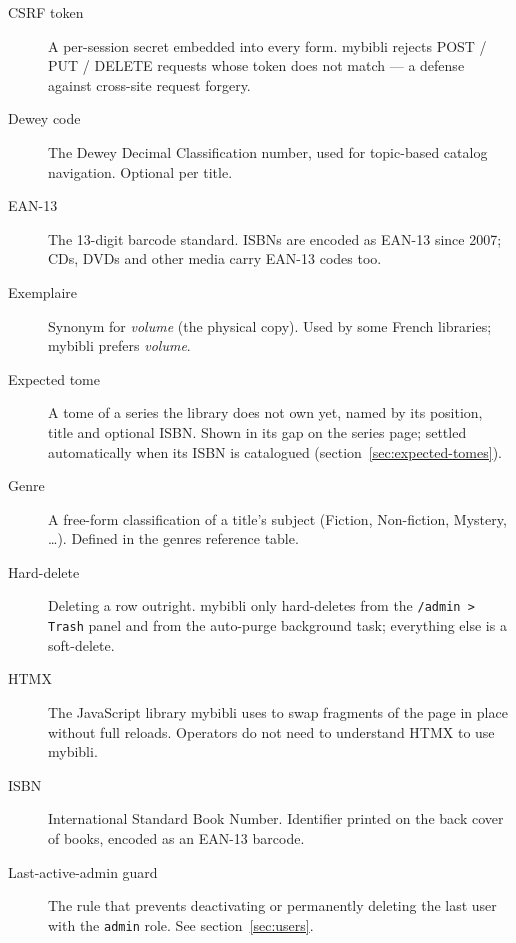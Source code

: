 \begin{description}
  \item[CSRF token] A per-session secret embedded into
        every form. mybibli rejects POST / PUT / DELETE requests
        whose token does not match — a defense against cross-site
        request forgery.

  \item[Dewey code] The Dewey Decimal Classification
        number, used for topic-based catalog navigation. Optional
        per title.

  \item[EAN-13] The 13-digit barcode standard. ISBNs are encoded
        as EAN-13 since 2007; CDs, DVDs and other media carry
        EAN-13 codes too.

  \item[Exemplaire] Synonym for \emph{volume} (the physical copy).
        Used by some French libraries; mybibli prefers
        \emph{volume}.

  \item[Expected tome] A tome of a series the
        library does not own yet, named by its position, title and
        optional ISBN. Shown in its gap on the series page; settled
        automatically when its ISBN is catalogued
        (section~\ref{sec:expected-tomes}).

  \item[Genre] A free-form classification of a title's
        subject (Fiction, Non-fiction, Mystery, \dots). Defined in
        the genres reference table.

  \item[Hard-delete] Deleting a row outright. mybibli only
        hard-deletes from the \texttt{/admin > Trash} panel and
        from the auto-purge background task; everything else is a
        soft-delete.

  \item[HTMX] The JavaScript library mybibli uses to swap fragments
        of the page in place without full reloads. Operators do
        not need to understand HTMX to use mybibli.

  \item[ISBN] International Standard Book Number. Identifier
        printed on the back cover of books, encoded as an EAN-13
        barcode.

  \item[Last-active-admin guard]
        The rule that prevents deactivating or permanently
        deleting the last user with the \texttt{admin} role. See
        section~\ref{sec:users}.


\end{description}
